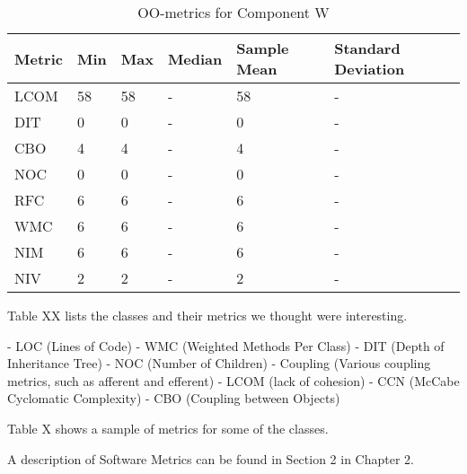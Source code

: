 \begin{table}[]
\centering
\caption{OO-metrics for Component W}
\label{tab:oometrics-watch}
\begin{tabular}{|l|l|l|l|l|l|}
\hline
\textbf{Metric} & \textbf{Min} & \textbf{Max} & \textbf{Median} & \textbf{Sample Mean} & \textbf{Standard Deviation} \\ \hline
LCOM            & 58           & 58           & -               & 58                   & -                           \\ \hline
DIT             & 0            & 0            & -               & 0                    & -                           \\ \hline
CBO             & 4            & 4            & -               & 4                    & -                           \\ \hline
NOC             & 0            & 0            & -               & 0                    & -                           \\ \hline
RFC             & 6            & 6            & -               & 6                    & -                           \\ \hline
WMC             & 6            & 6            & -               & 6                    & -                           \\ \hline
NIM             & 6            & 6            & -               & 6                    & -                           \\ \hline
NIV             & 2            & 2            & -               & 2                    & -                           \\ \hline
\end{tabular}
\end{table}







Table XX lists the classes and their metrics we thought were interesting. 


- LOC (Lines of Code)
- WMC (Weighted Methods Per Class)
- DIT (Depth of Inheritance Tree)
- NOC (Number of Children)
- Coupling (Various coupling metrics, such as afferent and efferent)
- LCOM (lack of cohesion)
- CCN (McCabe Cyclomatic Complexity)
- CBO (Coupling between Objects)

Table X shows a sample of metrics for some of the classes. 


A description of Software Metrics can be found in Section 2 in Chapter 2. 


